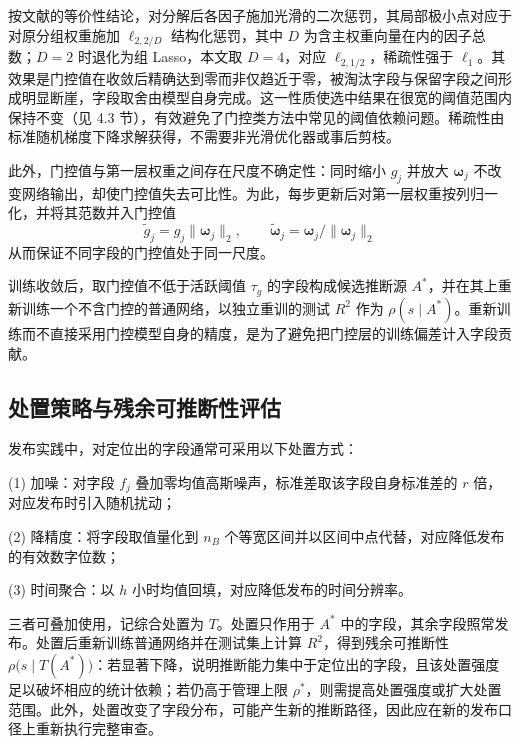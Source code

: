 \documentclass[UTF8,zihao=5,twoside,fontset=none]{ctexart}
\begin{document}
按文献\cite{ref-dgating}的等价性结论，对分解后各因子施加光滑的二次惩罚，其局部极小点对应于对原分组权重施加 $\ell_{2,2/D}$ 结构化惩罚，其中 $D$ 为含主权重向量在内的因子总数；$D=2$ 时退化为组 Lasso，本文取 $D=4$，对应 $\ell_{2,1/2}$，稀疏性强于 $\ell_1$。其效果是门控值在收敛后精确达到零而非仅趋近于零，被淘汰字段与保留字段之间形成明显断崖，字段取舍由模型自身完成。这一性质使选中结果在很宽的阈值范围内保持不变（见 4.3 节），有效避免了门控类方法中常见的阈值依赖问题。稀疏性由标准随机梯度下降求解获得，不需要非光滑优化器或事后剪枝。

此外，门控值与第一层权重之间存在尺度不确定性：同时缩小 $g_j$ 并放大 $\bm{\omega}_j$ 不改变网络输出，却使门控值失去可比性。为此，每步更新后对第一层权重按列归一化，并将其范数并入门控值
\begin{equation}
\tilde g_j=g_j\|\bm{\omega}_j\|_2,\qquad
\tilde{\bm{\omega}}_j=\bm{\omega}_j/\|\bm{\omega}_j\|_2
\end{equation}
从而保证不同字段的门控值处于同一尺度。

训练收敛后，取门控值不低于活跃阈值 $\tau_g$ 的字段构成候选推断源 $A^{\ast}$，并在其上重新训练一个不含门控的普通网络，以独立重训的测试 $R^2$ 作为 $\rho(s\mid A^{\ast})$。重新训练而不直接采用门控模型自身的精度，是为了避免把门控层的训练偏差计入字段贡献。

\subsection{处置策略与残余可推断性评估}

发布实践中，对定位出的字段通常可采用以下处置方式：

(1) 加噪：对字段 $f_j$ 叠加零均值高斯噪声，标准差取该字段自身标准差的 $r$ 倍，对应发布时引入随机扰动；

(2) 降精度：将字段取值量化到 $n_B$ 个等宽区间并以区间中点代替，对应降低发布的有效数字位数；

(3) 时间聚合：以 $h$ 小时均值回填，对应降低发布的时间分辨率。

三者可叠加使用，记综合处置为 $T$。处置只作用于 $A^{\ast}$ 中的字段，其余字段照常发布。处置后重新训练普通网络并在测试集上计算 $R^2$，得到残余可推断性 $\rho\big(s\mid T(A^{\ast})\big)$：若显著下降，说明推断能力集中于定位出的字段，且该处置强度足以破坏相应的统计依赖；若仍高于管理上限 $\rho^{\ast}$，则需提高处置强度或扩大处置范围。此外，处置改变了字段分布，可能产生新的推断路径，因此应在新的发布口径上重新执行完整审查。

\end{document}
